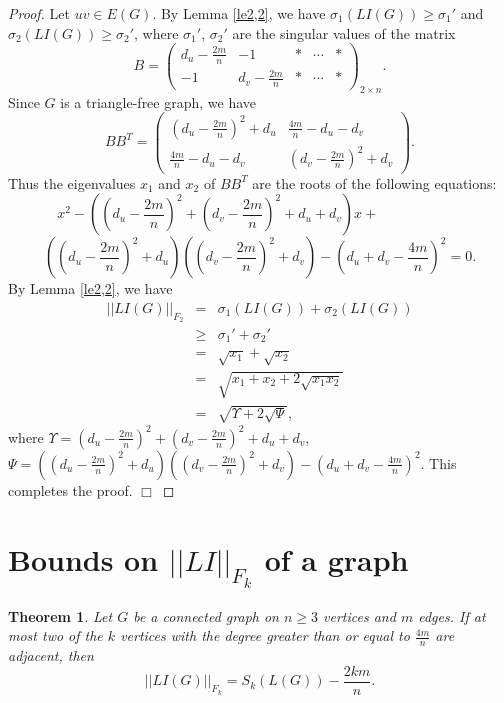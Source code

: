 \documentclass[12pt, a4paper]{article}
\newtheorem{theorem}{Theorem}[section]
\begin{document}
\begin{proof} Let $uv\in E(G)$. By Lemma \ref{le2,2}, we have $\sigma_1(LI(G))\geq \sigma_1'$ and $\sigma_2(LI(G))\geq \sigma_2'$, where $\sigma_1'$, $\sigma_2'$ are the singular values of the matrix
$$B=\begin{pmatrix}
d_u-\frac{2m}{n} & -1 & * & \cdots & *\\
-1 & d_v-\frac{2m}{n} & * & \cdots & *
\end{pmatrix}_{2\times n}.$$
Since $G$ is a triangle-free graph, we have
$$BB^T=\begin{pmatrix}
(d_u-\frac{2m}{n})^2+d_u & \frac{4m}{n}-d_u-d_v\\
\frac{4m}{n}-d_u-d_v& (d_v-\frac{2m}{n})^2+d_v
\end{pmatrix}.$$
Thus the eigenvalues $x_1$ and $x_2$ of $BB^T$ are the roots of the following equations:
$$x^2-\left(\left(d_u-\frac{2m}{n}\right)^2+\left(d_v-\frac{2m}{n}\right)^2+d_u+d_v\right)x+~~~~~~~~~~~~~~~~~~~~~~~~~~~$$
$$\left(\left(d_u-\frac{2m}{n}\right)^2+d_u\right)\left(\left(d_v-\frac{2m}{n}\right)^2+d_v\right)-\left(d_u+d_v-\frac{4m}{n}\right)^2=0.$$
By Lemma \ref{le2,2}, we have
\begin{eqnarray*}
||LI(G)||_{F_2} & = & \sigma_1(LI(G))+\sigma_2(LI(G))\\
& \geq & \sigma_1'+\sigma_2'\\
& = & \sqrt{x_1}+\sqrt{x_2}\\
& = & \sqrt{x_1+x_2+2\sqrt{x_1x_2}}\\
& = & \sqrt{\Upsilon+2\sqrt{\Psi}},
\end{eqnarray*}
where $\Upsilon=\left(d_u-\frac{2m}{n}\right)^2+\left(d_v-\frac{2m}{n}\right)^2+d_u+d_v$, $\Psi=\left(\left(d_u-\frac{2m}{n}\right)^2+d_u\right)\left(\left(d_v-\frac{2m}{n}\right)^2+d_v\right)-\left(d_u+d_v-\frac{4m}{n}\right)^2$.
 This completes the proof. $\Box$
\end{proof}




\section{\large  Bounds on  $||LI||_{F_k}$  of a graph}


\begin{theorem}\label{th4,1} %
Let $G$ be a connected graph on $n\geq 3$ vertices and $m$ edges. If at most two of the $k$ vertices with the degree greater than or equal to $\frac{4m}{n}$ are  adjacent, then
$$||LI(G)||_{F_k}=S_k(L(G))-\frac{2km}{n}.$$
\end{theorem}
\end{document}
